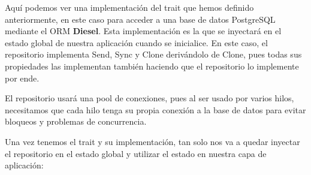 Aquí podemos ver una implementación del trait que hemos definido anteriormente, en este caso para acceder a una base de datos PostgreSQL mediante el ORM \textbf{Diesel}. Esta implementación es la que se inyectará en el estado global de nuestra aplicación cuando se inicialice.
En este caso, el repositorio implementa Send, Sync y Clone derivándolo de Clone, pues todas sus propiedades las implementan también haciendo que el repositorio lo implemente por ende.

El repositorio usará una pool de conexiones, pues al ser usado por varios hilos, necesitamos que cada hilo tenga su propia conexión a la base de datos para evitar bloqueos y problemas de concurrencia.

Una vez tenemos el trait y su implementación, tan solo nos va a quedar inyectar el repositorio en el estado global y utilizar el estado en nuestra capa de aplicación:
